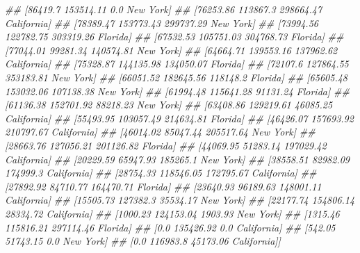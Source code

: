 \documentclass[
]{book}
\newenvironment{Shaded}{\begin{snugshade}}{\end{snugshade}}
\newcommand{\CommentTok}[1]{\textcolor[rgb]{0.56,0.35,0.01}{\textit{#1}}}
\theoremstyle{definition}
\theoremstyle{definition}
\theoremstyle{definition}
\theoremstyle{definition}
\theoremstyle{remark}
\begin{document}
\begin{Shaded}
\begin{Highlighting}[]
\CommentTok{\#\#  [86419.7 153514.11 0.0 \textquotesingle{}New York\textquotesingle{}]}
\CommentTok{\#\#  [76253.86 113867.3 298664.47 \textquotesingle{}California\textquotesingle{}]}
\CommentTok{\#\#  [78389.47 153773.43 299737.29 \textquotesingle{}New York\textquotesingle{}]}
\CommentTok{\#\#  [73994.56 122782.75 303319.26 \textquotesingle{}Florida\textquotesingle{}]}
\CommentTok{\#\#  [67532.53 105751.03 304768.73 \textquotesingle{}Florida\textquotesingle{}]}
\CommentTok{\#\#  [77044.01 99281.34 140574.81 \textquotesingle{}New York\textquotesingle{}]}
\CommentTok{\#\#  [64664.71 139553.16 137962.62 \textquotesingle{}California\textquotesingle{}]}
\CommentTok{\#\#  [75328.87 144135.98 134050.07 \textquotesingle{}Florida\textquotesingle{}]}
\CommentTok{\#\#  [72107.6 127864.55 353183.81 \textquotesingle{}New York\textquotesingle{}]}
\CommentTok{\#\#  [66051.52 182645.56 118148.2 \textquotesingle{}Florida\textquotesingle{}]}
\CommentTok{\#\#  [65605.48 153032.06 107138.38 \textquotesingle{}New York\textquotesingle{}]}
\CommentTok{\#\#  [61994.48 115641.28 91131.24 \textquotesingle{}Florida\textquotesingle{}]}
\CommentTok{\#\#  [61136.38 152701.92 88218.23 \textquotesingle{}New York\textquotesingle{}]}
\CommentTok{\#\#  [63408.86 129219.61 46085.25 \textquotesingle{}California\textquotesingle{}]}
\CommentTok{\#\#  [55493.95 103057.49 214634.81 \textquotesingle{}Florida\textquotesingle{}]}
\CommentTok{\#\#  [46426.07 157693.92 210797.67 \textquotesingle{}California\textquotesingle{}]}
\CommentTok{\#\#  [46014.02 85047.44 205517.64 \textquotesingle{}New York\textquotesingle{}]}
\CommentTok{\#\#  [28663.76 127056.21 201126.82 \textquotesingle{}Florida\textquotesingle{}]}
\CommentTok{\#\#  [44069.95 51283.14 197029.42 \textquotesingle{}California\textquotesingle{}]}
\CommentTok{\#\#  [20229.59 65947.93 185265.1 \textquotesingle{}New York\textquotesingle{}]}
\CommentTok{\#\#  [38558.51 82982.09 174999.3 \textquotesingle{}California\textquotesingle{}]}
\CommentTok{\#\#  [28754.33 118546.05 172795.67 \textquotesingle{}California\textquotesingle{}]}
\CommentTok{\#\#  [27892.92 84710.77 164470.71 \textquotesingle{}Florida\textquotesingle{}]}
\CommentTok{\#\#  [23640.93 96189.63 148001.11 \textquotesingle{}California\textquotesingle{}]}
\CommentTok{\#\#  [15505.73 127382.3 35534.17 \textquotesingle{}New York\textquotesingle{}]}
\CommentTok{\#\#  [22177.74 154806.14 28334.72 \textquotesingle{}California\textquotesingle{}]}
\CommentTok{\#\#  [1000.23 124153.04 1903.93 \textquotesingle{}New York\textquotesingle{}]}
\CommentTok{\#\#  [1315.46 115816.21 297114.46 \textquotesingle{}Florida\textquotesingle{}]}
\CommentTok{\#\#  [0.0 135426.92 0.0 \textquotesingle{}California\textquotesingle{}]}
\CommentTok{\#\#  [542.05 51743.15 0.0 \textquotesingle{}New York\textquotesingle{}]}
\CommentTok{\#\#  [0.0 116983.8 45173.06 \textquotesingle{}California\textquotesingle{}]]}
\end{Highlighting}
\end{Shaded}
\end{document}
